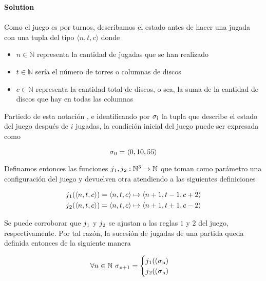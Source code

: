 
\noindent\textbf{Solution}\\\\

Como el juego es por turnos, describamos el estado antes de hacer una jugada con una tupla del tipo $\langle n, t, c\rangle $ donde

\begin{itemize}
	\item{$n \in \mathbb{N}$ representa la cantidad de jugadas que se han realizado }
	\item{$t \in \mathbb{N}$} sería el número de torres o columnas de discos 
	\item{$c \in \mathbb{N}$ representa la cantidad total de discos, o sea, la suma de la cantidad de discos que hay en todas las columnas}
\end{itemize}

Partiedo de esta notación , e identificando por $\sigma\textsubscript{i}$ la tupla que describe el estado del juego después de $i$ jugadas, la condición inicial del juego puede ser expresada como

\begin{equation} \label{eq_91_obr202300002_1}
	\sigma\textsubscript{0} = \langle 0, 10, 55\rangle 
\end{equation}

Definamos entonces las funciones $j\textsubscript{1}, j\textsubscript{2}: \mathbb{N}^3 \to \mathbb{N}$ que toman como parámetro una configuración del juego y devuelven otra atendiendo a las siguientes definiciones

\begin{equation} \label{eq_91_obr202300002_2}
\begin{gathered}
	j\textsubscript{1}(\langle n, t, c\rangle) = \langle n, t, c\rangle  \mapsto \langle n+1, t-1, c+2\rangle \\
	j\textsubscript{2}(\langle n, t, c\rangle ) = \langle n, t, c\rangle  \mapsto \langle n+1, t+1, c-2\rangle 
\end{gathered}
\end{equation}

Se puede corroborar que $j\textsubscript{1}$ y $j\textsubscript{2}$ se ajustan a las reglas $1$ y $2$ del juego, respectivamente. Por tal razón, la sucesión de jugadas de una partida queda definida entonces de la siguiente manera

\begin{equation} \label{eq_91_obr202300002_3}
	\forall n \in \mathbb{N}\ \sigma\textsubscript{n+1} = 
		\begin{cases}
			j\textsubscript{1}((\sigma\textsubscript{n}) \\
			j\textsubscript{2}((\sigma\textsubscript{n})
		\end{cases}
\end{equation}

